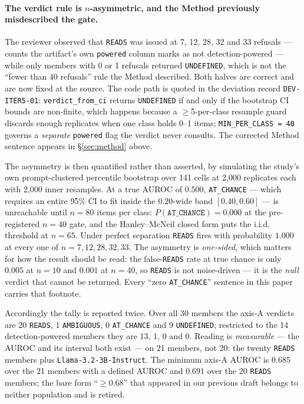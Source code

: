 \documentclass[11pt,letterpaper]{article}
\begin{document}
\paragraph{The verdict rule is \texorpdfstring{$n$}{n}-asymmetric, and the Method previously misdescribed the gate.} The reviewer observed that \texttt{READS} was issued at 7, 12, 28, 32 and 33 refusals --- counts the artifact's own \texttt{powered} column marks as not detection-powered --- while only members with 0 or 1 refusals returned \texttt{UNDEFINED}, which is not the ``fewer than 40 refusals'' rule the Method described. Both halves are correct and are now fixed at the source. The code path is quoted in the deviation record \texttt{DEV-ITER5-01}: \texttt{verdict\_from\_ci} returns \texttt{UNDEFINED} if and only if the bootstrap CI bounds are non-finite, which happens because a $\geq$5-per-class resample guard discards enough replicates when one class holds 0--1 items; \texttt{MIN\_PER\_CLASS = 40} governs a \emph{separate} \texttt{powered} flag the verdict never consults. The corrected Method sentence appears in \S\ref{sec:method} above.

The asymmetry is then quantified rather than asserted, by simulating the study's own prompt-clustered percentile bootstrap over 141 cells at 2,000 replicates each with 2,000 inner resamples. At a true AUROC of $0.500$, \texttt{AT\_CHANCE} --- which requires an entire 95\% CI to fit inside the $0.20$-wide band $[0.40, 0.60]$ --- is unreachable until $n = 80$ items per class: $P(\texttt{AT\_CHANCE}) = 0.000$ at the pre-registered $n = 40$ gate, and the Hanley--McNeil closed form puts the i.i.d. threshold at $n = 65$. Under perfect separation \texttt{READS} fires with probability $1.000$ at every one of $n = 7, 12, 28, 32, 33$. The asymmetry is \emph{one-sided}, which matters for how the result should be read: the false-\texttt{READS} rate at true chance is only $0.005$ at $n = 10$ and $0.001$ at $n = 40$, so \texttt{READS} is not noise-driven --- it is the \emph{null} verdict that cannot be returned. Every ``zero \texttt{AT\_CHANCE}'' sentence in this paper carries that footnote.

Accordingly the tally is reported twice. Over all 30 members the axis-A verdicts are 20 \texttt{READS}, 1 \texttt{AMBIGUOUS}, 0 \texttt{AT\_CHANCE} and 9 \texttt{UNDEFINED}; restricted to the 14 detection-powered members they are 13, 1, 0 and 0. Reading is \emph{measurable} --- the AUROC and its interval both exist --- on 21 members, not 20: the twenty \texttt{READS} members plus \texttt{Llama-3.2-3B-Instruct}. The minimum axis-A AUROC is $0.685$ over the 21 members with a defined AUROC and $0.691$ over the 20 \texttt{READS} members; the bare form ``$\geq 0.68$'' that appeared in our previous draft belongs to neither population and is retired.
\end{document}
